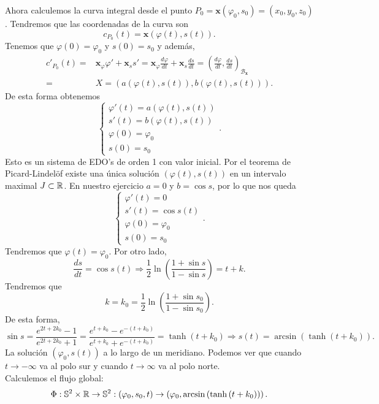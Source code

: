 \begin{eg}[Esfera]
Ahora calculemos la curva integral desde el punto $\displaystyle P_{0}= \textbf{x} \left(\varphi_{0}, s_{0}\right)=\left(x_{0}, y_{0}, z_{0}\right) $. Tendremos que las coordenadas de la curva son
\[c_{P_{0}}\left(t\right)= \textbf{x} \left(\varphi\left(t\right), s\left(t\right)\right) .\]
Tenemos que $\displaystyle \varphi\left(0\right)=\varphi_{0} $ y $\displaystyle s\left(0\right)=s_{0} $ y además, 
\[
\begin{split}
	c'_{P_{0}}\left(t\right)= & \textbf{x} _{\varphi}\varphi' + \textbf{x} _{s}s' = \textbf{x} _{\varphi}\frac{d\varphi}{dt} + \textbf{x} _{s}\frac{d s}{dt} = \left(\frac{d\varphi}{dt}, \frac{d s}{dt}\right)_{\mathcal{B}_{ \textbf{x} }}\\
	= & X = \left(a\left(\varphi\left(t\right), s\left(t\right)\right), b\left(\varphi\left(t\right), s\left(t\right)\right)\right)	.
\end{split}
\]
De esta forma obtenemos 
\[
\begin{cases}
\varphi'\left(t\right) = a\left(\varphi\left(t\right), s\left(t\right)\right) \\
s'\left(t\right) = b\left(\varphi\left(t\right), s\left(t\right)\right) \\
\varphi\left(0\right)=\varphi_{0} \\
s\left(0\right)=s_{0}
\end{cases}
.\]
Esto es un sistema de EDO's de orden 1 con valor inicial. Por el teorema de Picard-Lindelöf existe una única solución $\displaystyle \left(\varphi\left(t\right), s\left(t\right)\right) $ en un intervalo maximal $\displaystyle J \subset \mathbb{R} $. En nuestro ejercicio $\displaystyle a = 0 $ y $\displaystyle b = \cos s $, por lo que nos queda
\[
\begin{cases}
\varphi'\left(t\right)= 0 \\
s'\left(t\right)=\cos s\left(t\right) \\
\varphi\left(0\right)=\varphi_{0} \\
s\left(0\right)=s_{0}
\end{cases}
.\]
Tendremos que $\displaystyle \varphi\left(t\right)=\varphi_{0} $. Por otro lado, 
\[\frac{d s}{dt}= \cos s\left(t\right) \Rightarrow \frac{1}{2}\ln\left(\frac{1 + \sin s}{1 - \sin s}\right) = t + k.\]
Tendremos que 
\[k = k_{0} =  \frac{1}{2}\ln\left(\frac{1+\sin s_{0}}{1-\sin s_{0}}\right).\]
De esta forma, 
\[\sin s = \frac{e^{2t+2k_{0}}-1}{e^{2t+2k_{0}}+1} = \frac{e^{t+k_{0}}-e^{-\left(t+k_{0}\right)}}{e^{t+k_{0}}+e^{-\left(t+k_{0}\right)}}=\tanh\left(t + k_{0}\right)\Rightarrow s\left(t\right)=\arcsin\left(\tanh\left(t+k_{0}\right)\right) .\]
La solución $\displaystyle \left(\varphi_{0}, s\left(t\right)\right) $ a lo largo de un meridiano. Podemos ver que cuando $\displaystyle t \to -\infty  $ va al polo sur y cuando $\displaystyle t \to \infty  $ va al polo norte.  
\\

Calculemos el flujo global:
\[\Phi : \mathbb{S}^{2} \times \mathbb{R} \to \mathbb{S}^{2} : \left(\varphi_{0}, s_{0}, t\right)\to \left(\varphi_{0}, \arcsin\left(\tanh\left(t + k_{0}\right)\right)\right).\]
\end{eg}
